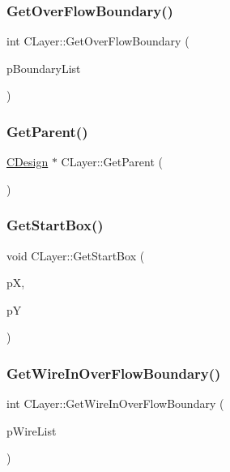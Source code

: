 \subsubsection{\texorpdfstring{GetOverFlowBoundary()}{GetOverFlowBoundary()}}
{\footnotesize\ttfamily int C\+Layer\+::\+Get\+Over\+Flow\+Boundary (\begin{DoxyParamCaption}\item[{vector$<$ \mbox{\hyperlink{classCBoundary}{C\+Boundary}} $\ast$ $>$ $\ast$}]{p\+Boundary\+List }\end{DoxyParamCaption})}

\mbox{\label{classCLayer_a823b6e80c3ab3f60f7e86cde75c8dec8}} 
\subsubsection{\texorpdfstring{GetParent()}{GetParent()}}
{\footnotesize\ttfamily \mbox{\hyperlink{classCDesign}{C\+Design}} $\ast$ C\+Layer\+::\+Get\+Parent (\begin{DoxyParamCaption}{ }\end{DoxyParamCaption})}

\mbox{\label{classCLayer_a4b4499ed47902f08d9100e2c22d09144}} 
\subsubsection{\texorpdfstring{GetStartBox()}{GetStartBox()}}
{\footnotesize\ttfamily void C\+Layer\+::\+Get\+Start\+Box (\begin{DoxyParamCaption}\item[{vector$<$ int $>$ $\ast$}]{pX,  }\item[{vector$<$ int $>$ $\ast$}]{pY }\end{DoxyParamCaption})}

\mbox{\label{classCLayer_aa24a4614c4584721a8d10e43952c5af2}} 
\subsubsection{\texorpdfstring{GetWireInOverFlowBoundary()}{GetWireInOverFlowBoundary()}}
{\footnotesize\ttfamily int C\+Layer\+::\+Get\+Wire\+In\+Over\+Flow\+Boundary (\begin{DoxyParamCaption}\item[{hash\+\_\+map$<$ \mbox{\hyperlink{BoxRouter_8h_a280feb883e9d4a7edcc69c8bcb9f38f2}{A\+D\+D\+R\+E\+SS}}, int $>$ $\ast$}]{p\+Wire\+List }\end{DoxyParamCaption})}

